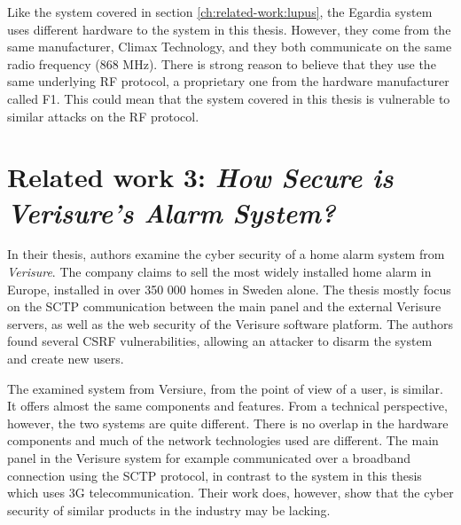 Like the system covered in section \ref{ch:related-work:lupus}, the Egardia system uses different hardware to the system in this thesis. However, they come from the same manufacturer, Climax Technology, and they both communicate on the same radio frequency (868 MHz). There is strong reason to believe that they use the same underlying \gls{RF} protocol, a proprietary one from the hardware manufacturer called F1. This could mean that the system covered in this thesis is vulnerable to similar attacks on the \gls{RF} protocol.

\section{Related work 3: \textit{How Secure is Verisure’s Alarm System?}}
In their thesis, authors \citeauthor{verisurethesis} examine the cyber security of a home alarm system from \textit{Verisure}. The company claims to sell the most widely installed home alarm in Europe, installed in over 350 000 homes in Sweden alone. The thesis mostly focus on the SCTP communication between the main panel and the external Verisure servers, as well as the web security of the Verisure software platform. The authors found several \gls{CSRF} vulnerabilities, allowing an attacker to disarm the system and create new users.

The examined system from Versiure, from the point of view of a user, is similar. It offers almost the same components and features. From a technical perspective, however, the two systems are quite different. There is no overlap in the hardware components and much of the network technologies used are different. The main panel in the Verisure system for example communicated over a broadband connection using the SCTP protocol, in contrast to the system in this thesis which uses 3G telecommunication. Their work does, however, show that the cyber security of similar products in the industry may be lacking.
